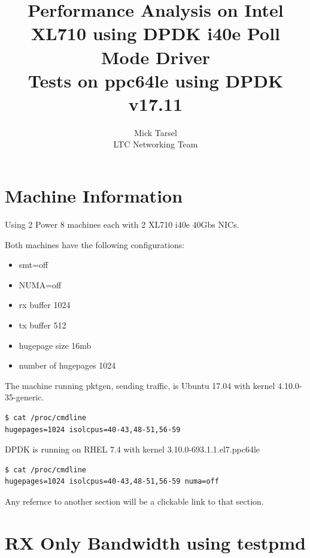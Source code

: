 \documentclass[letter]{article}
\title{Performance Analysis on Intel XL710 using DPDK i40e Poll Mode Driver \\ Tests on ppc64le using DPDK v17.11}
\author{Mick Tarsel \\  LTC Networking Team \\}
\begin{document}

\maketitle

\newpage
\tableofcontents
\newpage

\section{Machine Information}
{\setlength{\parindent}{0cm}

Using 2 Power 8 machines each with 2 XL710 i40e 40Gbs NICs.

Both machines have the following configurations:
\begin{itemize}
\item smt=off
\item NUMA=off
\item rx buffer 1024
\item tx buffer 512
\item hugepage size 16mb
\item number of hugepages 1024
\end{itemize}

The machine running pktgen, sending traffic, is Ubuntu 17.04 with kernel 4.10.0-35-generic.
\begin{lstlisting}[escapechar=!]
$ cat /proc/cmdline
hugepages=1024 isolcpus=40-43,48-51,56-59
\end{lstlisting}
 
DPDK is running on RHEL 7.4 with kernel 3.10.0-693.1.1.el7.ppc64le
\begin{lstlisting}[escapechar=!]
$ cat /proc/cmdline
hugepages=1024 isolcpus=40-43,48-51,56-59 numa=off
\end{lstlisting}
Any refernce to another section will be a clickable link to that section.


\section{RX Only Bandwidth using testpmd}
{\setlength{\parindent}{0cm}

}}
\end{document}
